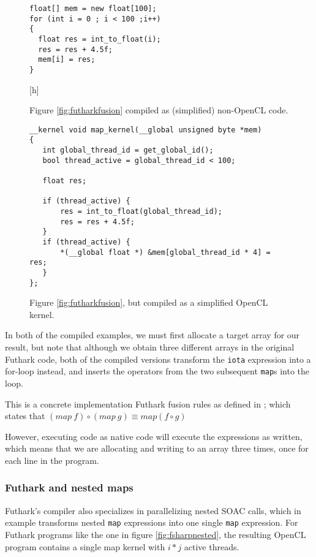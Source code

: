 \begin{figure}[h]
  \centering
\begin{verbatim}
float[] mem = new float[100];
for (int i = 0 ; i < 100 ;i++)
{
  float res = int_to_float(i);
  res = res + 4.5f;
  mem[i] = res;
}
\end{verbatim}[h]
  \caption{Figure \ref{fig:futharkfusion} compiled as (simplified) non-OpenCL
    \csharp{} code.}
  \label{fig:pseudofusion}
\end{figure}

\begin{figure}
  \centering
\begin{verbatim}
__kernel void map_kernel(__global unsigned byte *mem)
{
   int global_thread_id = get_global_id();
   bool thread_active = global_thread_id < 100;

   float res;

   if (thread_active) {
       res = int_to_float(global_thread_id);
       res = res + 4.5f;
   }
   if (thread_active) {
       *(__global float *) &mem[global_thread_id * 4] = res;
   }
};
\end{verbatim}
  \caption{Figure \ref{fig:futharkfusion}, but compiled as a simplified OpenCL kernel.}
  \label{fig:pseudokernel}
\end{figure}


In both of the compiled examples, we must first allocate a target array for our
result, but note that although we obtain three different arrays in the original
Futhark code, both of the compiled versions transform the \texttt{iota}
expression into a for-loop instead, and inserts the operators from the two
subsequent \texttt{map}s into the loop.

This is a concrete implementation Futhark fusion rules as defined in \cite{pldi17}; which states
that $(map~f) \circ (map~g) \equiv map (f \circ g)$

However, executing \fshark{} code as native \fsharp{} code will execute the
expressions as written, which means that we are allocating and writing to an
array three times, once for each line in the program.

\subsubsection*{Futhark and nested maps}
Futhark's compiler also specializes in parallelizing nested SOAC
calls\cite{pldi17}, which in example transforms nested \texttt{map} expressions into one
single \texttt{map} expression. For Futhark programs like the one in figure
\ref{fig:fsharpnested}, the resulting OpenCL program contains a single map
kernel with $i * j$ active threads.

